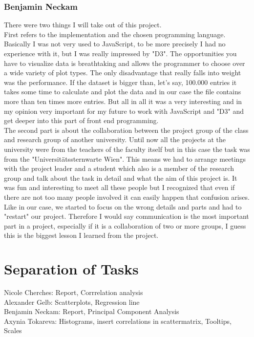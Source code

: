 \documentclass{vgtc}                          %
\begin{document}
\subsubsection{Benjamin Neckam}
There were two things I will take out of this project.\\
First refers to the implementation and the chosen programming language. Basically I was not very used to JavaScript, to be more precisely I had no experience with it, but I was really impressed by "D3". The opportunities you have to visualize data is breathtaking and allows the programmer to choose over a wide variety of plot types. The only disadvantage that really falls into weight was the performance. If the dataset is bigger than, let's say, 100.000 entries it takes some time to calculate and plot the data and in our case the file contains more than ten times more entries. But all in all it was a very interesting and in my opinion very important for my future to work with JavaScript and "D3" and get deeper into this part of front end programming.\\
The second part is about the collaboration between the project group of the class and research group of another university. Until now all the projects at the university were from the teachers of the faculty itself but in this case the task was from the "Universitätssternwarte Wien". This means we had to arrange meetings with the project leader and a student which also is a member of the research group and talk about the task in detail and what the aim of this project is. It was fun and interesting to meet all these people but I recognized that even if there are not too many people involved it can easily happen that confusion arises. Like in our case, we started to focus on the wrong details and parts and had to "restart" our project. Therefore I would say communication is the most important part in a project, especially if it is a collaboration of two or more groups, I guess this is the biggest lesson I learned from the project. 
\section{Separation of Tasks}
Nicole Cherches: Report, Corrrelation analysis\\
Alexander Gelb: Scatterplots, Regression line\\
Benjamin Neckam: Report, Principal Component Analysis\\
Axynia Tokareva: Histograms, insert correlations in scattermatrix, Tooltips, Scales


\end{document}
